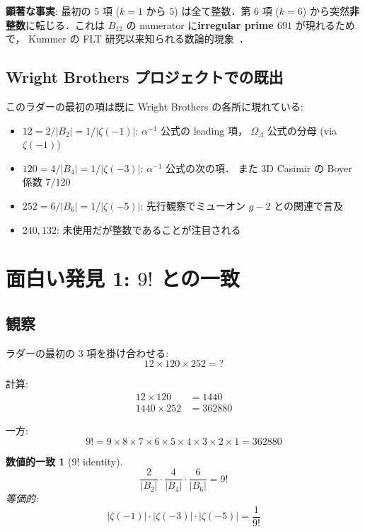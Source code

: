 \documentclass[11pt,a4paper]{article}
\newtheorem{coincidence}{数値的一致}
\begin{document}
\textbf{顕著な事実}: 最初の 5 項 ($k = 1$ から $5$) は全て整数．第 6 項
($k = 6$) から突然\textbf{非整数}に転じる．これは $B_{12}$ の
numerator に\textbf{irregular prime $691$} が現れるためで，
Kummer の FLT 研究以来知られる数論的現象~\cite{Kummer1850}．

\subsection{Wright Brothers プロジェクトでの既出}

このラダーの最初の項は既に Wright Brothers の各所に現れている:

\begin{itemize}
\item $12 = 2/|B_2| = 1/|\zeta(-1)|$: $\alpha^{-1}$ 公式の leading 項，
$\Omega_\Lambda$ 公式の分母 (via $\zeta(-1)$)
\item $120 = 4/|B_4| = 1/|\zeta(-3)|$: $\alpha^{-1}$ 公式の次の項．
また 3D Casimir の Boyer 係数 $7/120$
\item $252 = 6/|B_6| = 1/|\zeta(-5)|$: 先行観察でミューオン $g-2$
との関連で言及~\cite{muonNote}
\item $240, 132$: 未使用だが整数であることが注目される
\end{itemize}

\section{面白い発見 1: $9!$ との一致}

\subsection{観察}

ラダーの最初の 3 項を掛け合わせる:
\begin{equation}
12 \times 120 \times 252 = ?
\end{equation}

計算:
\begin{align}
12 \times 120 &= 1440\\
1440 \times 252 &= 362880
\end{align}

一方:
\begin{equation}
9! = 9 \times 8 \times 7 \times 6 \times 5 \times 4 \times 3 \times 2 \times 1 = 362880
\end{equation}

\begin{coincidence}[$9!$ identity]
\begin{equation}
\boxed{\frac{2}{|B_2|}\cdot\frac{4}{|B_4|}\cdot\frac{6}{|B_6|} = 9!}
\end{equation}
等価的:
\begin{equation}
|\zeta(-1)|\cdot|\zeta(-3)|\cdot|\zeta(-5)| = \frac{1}{9!}
\end{equation}
\end{coincidence}
\end{document}
